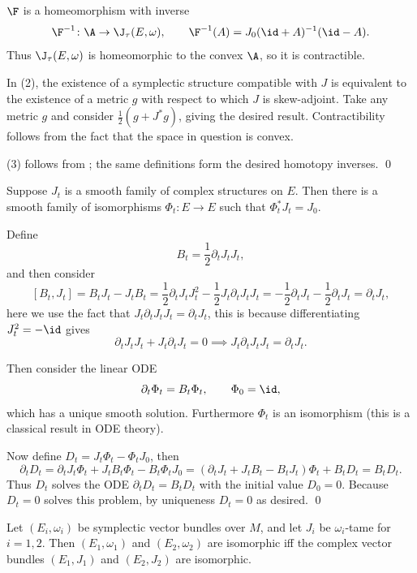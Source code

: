     $\F$ is a homeomorphism with inverse
    $$ \F^{-1}\colon\A\to\J_\tau(E,\omega),\qquad \F^{-1}(A) = J_0(\id+A)^{-1}(\id-A) . $$
    Thus $\J_\tau(E,\omega)$ is homeomorphic to the convex $\A$, so it is contractible.

    In (2), the existence of a symplectic structure compatible with $J$ is equivalent to the existence of a metric $g$ with respect to which $J$ is skew-adjoint.
    Take any metric $g$ and consider $\frac12(g+J^*g)$, giving the desired result.
    Contractibility follows from the fact that the space in question is convex.

    (3) follows from ; the same definitions form the desired homotopy inverses.
    \qed

\eproof

\blemm

    Suppose $J_t$ is a smooth family of complex structures on $E$.
    Then there is a smooth family of isomorphisms $\Phi_t\colon E\to E$ such that $\Phi_t^*J_t=J_0$.

\elemm

\bproof

    Define
    $$ B_t = \frac12\partial_tJ_tJ_t , $$
    and then consider
    $$ [B_t,J_t] = B_tJ_t - J_tB_t = \frac12\partial_tJ_tJ_t^2 - \frac12J_t\partial_tJ_tJ_t = -\frac12\partial_tJ_t - \frac12\partial_tJ_t = \partial_tJ_t , $$
    here we use the fact that $J_t\partial_tJ_tJ_t=\partial_tJ_t$, this is because differentiating $J_t^2=-\id$ gives
    $$ \partial_tJ_tJ_t + J_t\partial_tJ_t = 0 \implies J_t\partial_tJ_tJ_t = \partial_tJ_t . $$

    Then consider the linear ODE
    $$ \partial_t\Phi_t = B_t\Phi_t,\qquad \Phi_0 = \id , $$
    which has a unique smooth solution.
    Furthermore $\Phi_t$ is an isomorphism (this is a classical result in ODE theory).

    Now define $D_t=J_t\Phi_t-\Phi_tJ_0$, then
    $$ \partial_tD_t = \partial_tJ_t\Phi_t + J_tB_t\Phi_t - B_t\Phi_tJ_0 = (\partial_tJ_t + J_tB_t - B_tJ_t)\Phi_t + B_tD_t = B_tD_t . $$
    Thus $D_t$ solves the ODE $\partial_tD_t=B_tD_t$ with the initial value $D_0=0$.
    Because $D_t=0$ solves this problem, by uniqueness $D_t=0$ as desired.
    \qed

\eproof

\bthrm

    Let $(E_i,\omega_i)$ be symplectic vector bundles over $M$, and let $J_i$ be $\omega_i$-tame for $i=1,2$.
    Then $(E_1,\omega_1)$ and $(E_2,\omega_2)$ are isomorphic iff the complex vector bundles $(E_1,J_1)$ and $(E_2,J_2)$ are isomorphic.

